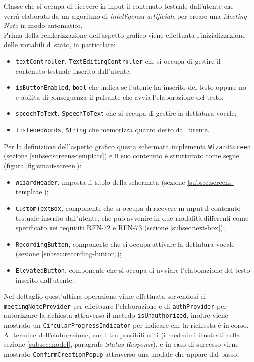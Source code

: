 Classe che si occupa di ricevere in input il contenuto testuale dall'utente che verrà elaborato da un algoritmo di \emph{intelligenza artificiale} per creare una \emph{Meeting Note} in modo automatico. \\
Prima della renderizzazione dell'aspetto grafico viene effettuata l'inizializzazione delle variabili di stato, in particolare:
\begin{itemize}
    \item \lstinline{textController}, \lstinline{TextEditingController}\cite{site:text-editing-controller} che si occupa di gestire il contenuto testuale inserito dall'utente;
    \item \lstinline{isButtonEnabled}, \lstinline{bool} che indica se l'utente ha inserito del testo oppure no e abilita di conseguenza il pulsante che avvia l'elaborazione del testo;
    \item \lstinline{speechToText}, \lstinline{SpeechToText}\cite{site:speech-to-text} che si occupa di gestire la dettatura vocale;
    \item \lstinline{listenedWords}, \lstinline{String} che memorizza quanto detto dall'utente.
\end{itemize}
Per la definizione dell'aspetto grafico questa schermata implementa \lstinline{WizardScreen} (sezione \ref{subsec:screens-template}) e il suo contenuto è strutturato come segue (figura \ref{fig:smart-screen}):
\begin{itemize}
    \item \lstinline{WizardHeader}, imposta il titolo della schermata (sezione \ref{subsec:screens-template});
    \item \lstinline{CustomTextBox}, componente che si occupa di ricevere in input il contenuto testuale inserito dall'utente, che può avvenire in due modalità differenti come specificato nei requisiti \hyperref[RFN-72]{RFN-72} e \hyperref[RFN-73]{RFN-73} (sezione \ref{subsec:text-box});
    \item \lstinline{RecordingButton}, componente che si occupa attivare la dettatura vocale (sezione \ref{subsec:recording-button});
    \item \lstinline{ElevatedButton}\cite{site:elevated-button}, componente che si occupa di avviare l'elaborazione del testo inserito dall'utente.
\end{itemize}
Nel dettaglio quest'ultima operazione viene effettuata servendosi di \lstinline{meetingNoteProvider} per effettuare l'elaborazione e di \lstinline{authProvider} per autorizzare la richiesta attraverso il metodo \lstinline{isUnauthorized}, inoltre viene mostrato un \lstinline{CircularProgressIndicator}\cite{site:circular-progress-indicator} per indicare che la richiesta è in corso. \\
Al termine dell'elaborazione, con i tre possibili esiti (i medesimi illustrati nella sezione \ref{subsec:model}, paragrafo \emph{Status Response}), e in caso di successo viene mostrato \lstinline{ConfirmCreationPopup} attraverso una modale che appare dal basso.

